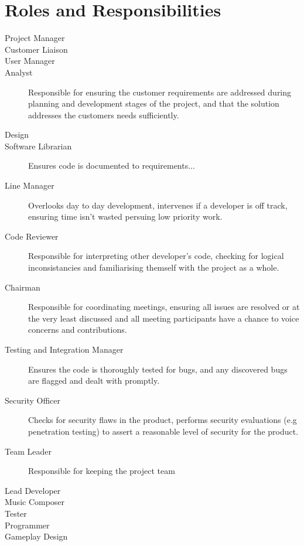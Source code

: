 \section{Roles and Responsibilities}
\label{section:roles}

\begin{description}
	\item[Project Manager]
	\item[Customer Liaison]
	\item[User Manager]
	\item[Analyst] Responsible for ensuring the customer requirements are addressed during planning and development stages of the project, and that the solution addresses the customers needs sufficiently.
	\item[Design]
	\item[Software Librarian] Ensures code is documented to requirements...
	\item[Line Manager] Overlooks day to day development, intervenes if a developer is off track, ensuring time isn't wasted persuing low priority work.
	\item[Code Reviewer] Responsible for interpreting other developer's code, checking for logical inconsistancies and familiarising themself with the project as a whole.
	\item[Chairman] Responsible for coordinating meetings, ensuring all issues are resolved or at the very least discussed and all meeting participants have a chance to voice concerns and contributions.
	\item[Testing and Integration Manager] Ensures the code is thoroughly tested for bugs, and any discovered bugs are flagged and dealt with promptly. 
	\item[Security Officer] Checks for security flaws in the product, performs security evaluations (e.g penetration testing) to assert a reasonable level of security for the product.
	\item[Team Leader] Responsible for keeping the project team 
	\item[Lead Developer]
	\item[Music Composer]
	\item[Tester] 
	\item[Programmer]
	\item[Gameplay Design]
\end{description}

